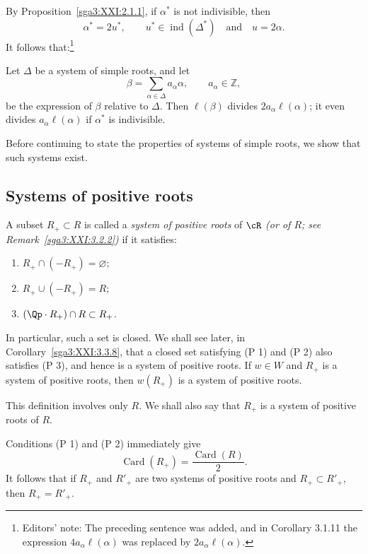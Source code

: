 By Proposition~\ref{sga3:XXI:2.1.1}, if \(\alpha^\ast\) is not
indivisible, then
\[
 \alpha^\ast=2u^\ast,
 \qquad
 u^\ast\in\operatorname{ind}(\Delta^\ast)
 \quad\text{and}\quad
 u=2\alpha.
\]
It follows that:\footnote{Editors' note: The preceding sentence was
added, and in Corollary 3.1.11 the expression
\(4a_\alpha\ell(\alpha)\) was replaced by
\(2a_\alpha\ell(\alpha)\).}

\begin{corollary}\label{sga3:XXI:3.1.11}
Let \(\Delta\) be a system of simple roots, and let
\[
 \beta=\sum_{\alpha\in\Delta}a_\alpha\alpha,
 \qquad a_\alpha\in\mathbb Z,
\]
be the expression of \(\beta\) relative to \(\Delta\). Then
\(\ell(\beta)\) divides \(2a_\alpha\ell(\alpha)\); it even divides
\(a_\alpha\ell(\alpha)\) if \(\alpha^\ast\) is indivisible.
\end{corollary}

Before continuing to state the properties of systems of simple roots,
we show that such systems exist.

\subsection{Systems of positive roots}

\begin{definition}\label{sga3:XXI:3.2.1}
A subset \(R_+\subset R\) is called a \emph{system of positive roots}
of \(\cR\) \emph{(or of \(R\); see
Remark~\ref{sga3:XXI:3.2.2}\emph{)}} if it satisfies:
\begin{enumerate}
\item[(P 1)] \(R_+\cap(-R_+)=\varnothing\);
\item[(P 2)] \(R_+\cup(-R_+)=R\);
\item[(P 3)] \((\Qp\cdot R_+)\cap R\subset R_+\).
\end{enumerate}
In particular, such a set is closed. We shall see later, in
Corollary~\ref{sga3:XXI:3.3.8}, that a closed set satisfying
(P 1) and (P 2) also satisfies (P 3), and hence is a system of
positive roots. If \(w\in W\) and \(R_+\) is a system of positive
roots, then \(w(R_+)\) is a system of positive roots.
\end{definition}

\begin{remark}\label{sga3:XXI:3.2.2}
This definition involves only \(R\). We shall also say that \(R_+\)
is a system of positive roots of \(R\).
\end{remark}

\begin{remark}\label{sga3:XXI:3.2.3}
Conditions (P 1) and (P 2) immediately give
\[
 \operatorname{Card}(R_+)=\frac{\operatorname{Card}(R)}{2}.
\]
It follows that if \(R_+\) and \(R'_+\) are two systems of positive
roots and \(R_+\subset R'_+\), then \(R_+=R'_+\).
\end{remark}

